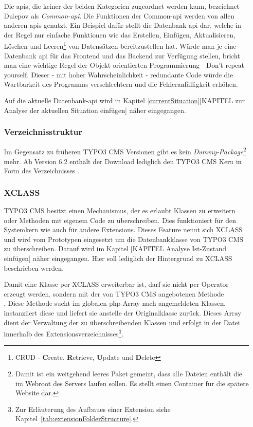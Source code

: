 Die \gls{api}s, die keiner der beiden Kategorien zugeordnet werden kann, bezeichnet Dulepov \cite[S. 5 ff.]{book:dulepovTypo32008} als \mbox{\textit{Common-\gls{api}}}. Die Funktionen der Common-\gls{api} werden von allen anderen \gls{api}s genutzt. Ein Beispiel dafür stellt die Datenbank \gls{api} dar, welche in der Regel nur einfache Funktionen wie das Erstellen, Einfügen, Aktualisieren, Löschen und Leeren\footnote{CRUD - {\bfseries C}reate, {\bfseries R}etrieve, {\bfseries U}pdate und {\bfseries D}elete} von Datensätzen bereitzustellen hat. Würde man je eine Datenbank \gls{api} für das Frontend und das Backend zur Verfügung stellen, bricht man eine wichtige Regel der Objekt-orientierten Programmierung - Don't repeat yourself. Dieser - mit hoher Wahrscheinlichkeit - redundante Code würde die Wartbarkeit des Programms verschlechtern und die Fehleranfälligkeit erhöhen.

Auf die aktuelle Datenbank-\gls{api} wird in Kapitel \ref{currentSituation}[KAPITEL zur Analyse der aktuellen Situation einfügen] näher eingegangen.

\subsubsection{Verzeichnisstruktur}

Im Gegensatz zu früheren TYPO3 CMS Versionen gibt es kein \mbox{\textit{Dummy-Package}}\footnote{Damit ist ein weitgehend leeres Paket gemeint, dass alle Dateien enthält die im Web\-root des Servers laufen sollen. Es stellt einen Container für die spätere Website dar.} mehr. Ab Version 6.2 enthält der Download lediglich den TYPO3 CMS Kern in Form des Verzeichnisses .

\subsubsection{XCLASS}
TYPO3 CMS besitzt einen Mechanismus, der es erlaubt Klassen zu erweitern oder Methoden mit eigenem Code zu überschreiben. Dies funktioniert für den Systemkern wie auch für andere Extensions. Dieses Feature nennt sich XCLASS und wird vom Prototypen eingesetzt um die Datenbankklasse von TYPO3 CMS zu überschreiben. Darauf wird im Kapitel [KAPITEL Analyse Ist-Zustand einfügen] näher eingegangen. Hier soll lediglich der Hintergrund zu XCLASS beschrieben werden.

Damit eine Klasse per XCLASS erweiterbar ist, darf sie nicht per  Operator erzeugt werden, sondern mit der von TYPO3 CMS angebotenen Methode\\
.
Diese Methode sucht im globalen \gls{php}-Array  nach angemeldeten Klassen, instanziiert diese und liefert sie anstelle der Originalklasse zurück. Dieses Array dient der Verwaltung der zu überschreibenden Klassen und erfolgt in der Datei  innerhalb des Extensionsverzeichnisses\footnote{Zur Erläuterung des Aufbaues einer Extension siehe Kapitel~\ref{tab:extensionFolderStructure}.}.

